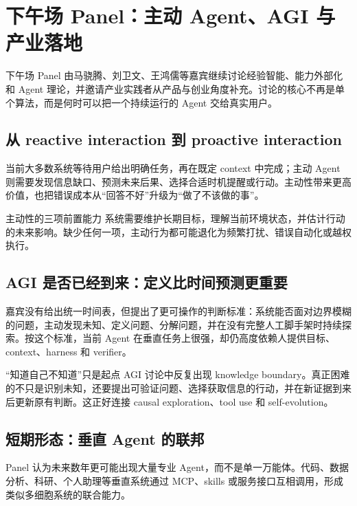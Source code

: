 \section{下午场 Panel：主动 Agent、AGI 与产业落地}

下午场 Panel 由马骁腾、刘卫文、王鸿儒等嘉宾继续讨论经验智能、能力外部化和 Agent 理论，并邀请产业实践者从产品与创业角度补充。讨论的核心不再是单个算法，而是何时可以把一个持续运行的 Agent 交给真实用户。

\subsection{从 reactive interaction 到 proactive interaction}

当前大多数系统等待用户给出明确任务，再在既定 context 中完成；主动 Agent 则需要发现信息缺口、预测未来后果、选择合适时机提醒或行动。主动性带来更高价值，也把错误成本从“回答不好”升级为“做了不该做的事”。

\begin{importantbox}{主动性的三项前置能力}
系统需要维护长期目标，理解当前环境状态，并估计行动的未来影响。缺少任何一项，主动行为都可能退化为频繁打扰、错误自动化或越权执行。
\end{importantbox}

\subsection{AGI 是否已经到来：定义比时间预测更重要}

嘉宾没有给出统一时间表，但提出了更可操作的判断标准：系统能否面对边界模糊的问题，主动发现未知、定义问题、分解问题，并在没有完整人工脚手架时持续探索。按这个标准，当前 Agent 在垂直任务上很强，却仍高度依赖人提供目标、context、harness 和 verifier。

\begin{knowledgebox}{“知道自己不知道”只是起点}
AGI 讨论中反复出现 knowledge boundary。真正困难的不只是识别未知，还要提出可验证问题、选择获取信息的行动，并在新证据到来后更新原有判断。这正好连接 causal exploration、tool use 和 self-evolution。
\end{knowledgebox}

\subsection{短期形态：垂直 Agent 的联邦}

Panel 认为未来数年更可能出现大量专业 Agent，而不是单一万能体。代码、数据分析、科研、个人助理等垂直系统通过 MCP、skills 或服务接口互相调用，形成类似多细胞系统的联合能力。


